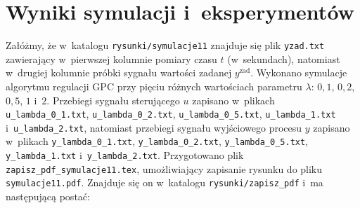 \section{Wyniki symulacji i~eksperymentów}
Załóżmy, że w~katalogu \verb+rysunki/symulacje11+ znajduje się plik \verb+yzad.txt+ zawierający w~pierwszej kolumnie pomiary czasu $t$ (w~sekundach), natomiast w~drugiej kolumnie próbki sygnału wartości zadanej $y^{\mathrm{zad}}$. Wykonano symulacje algorytmu regulacji GPC przy pięciu różnych wartościach parametru $\lambda$: $0{,}1$, $0{,}2$, $0{,}5$, $1$ i~$2$. Przebiegi sygnału sterującego $u$ zapisano w~plikach \verb+u_lambda_0_1.txt+, \verb+u_lambda_0_2.txt+, \verb+u_lambda_0_5.txt+, \verb+u_lambda_1.txt+ i~\verb+u_lambda_2.txt+, natomiast przebiegi sygnału wyjściowego procesu $y$ zapisano w~plikach \verb+y_lambda_0_1.txt+, \verb+y_lambda_0_2.txt+, \verb+y_lambda_0_5.txt+, \verb+y_lambda_1.txt+ i~\verb+y_lambda_2.txt+. Przygotowano plik \verb+zapisz_pdf_symulacje11.tex+, umożliwiający zapisanie rysunku do pliku \verb+symulacje11.pdf+. Znajduje się on w~katalogu \verb+rysunki/zapisz_pdf+ i~ma następującą postać:
